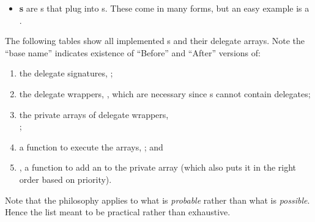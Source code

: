 \begin{itemize}
{\begin{center}
		\end{center}		 
		}
	\item{\textbf{s} are s that plug into s. These come in many forms, but an easy example is a . }
\end{itemize}









The following tables show all implemented s and their delegate arrays. Note the ``base name'' indicates existence of ``Before'' and ``After'' versions of:

\begin{enumerate}
	\item{the delegate signatures, ;}
	\item{the delegate wrappers, , which are necessary since s cannot contain delegates;}
	\item{the private arrays of delegate wrappers,\\ ;}
	\item{a function to execute the arrays, ; and}
	\item{, a function to add an  to the private array  (which also puts it in the right order based on priority).}
\end{enumerate}

\noindent Note that the philosophy applies to what is \textit{probable} rather than what is \textit{possible}. Hence the list meant to be practical rather than exhaustive.






